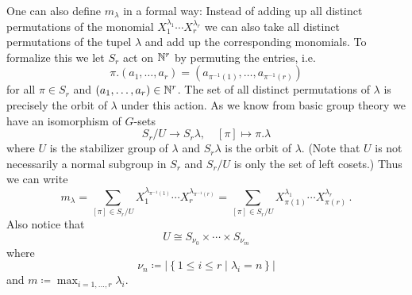 One can also define $m_\lambda$ in a formal way:
Instead of adding up all distinct permutations of the monomial $X_1^{\lambda_1} \dotsm X_r^{\lambda_r}$ we can also take all distinct permutations of the tupel $\lambda$ and add up the corresponding monomials.
To formalize this we let $S_r$ act on $\mathbb{N}^r$ by permuting the entries, i.e.\
\[
    \pi.(a_1, \dotsc, a_r)
  = \left( a_{\pi^{-1}(1)}, \dotsc, a_{\pi^{-1}(r)} \right)
\]
for all $\pi \in S_r$ and $(a_1, \dotsc, a_r) \in \mathbb{N}^r$.
The set of all distinct permutations of $\lambda$ is precisely the orbit of $\lambda$ under this action.
As we know from basic group theory we have an isomorphism of $G$-sets
\[
          S_r / U
  \to     S_r \lambda,
  \quad   [\pi]
  \mapsto \pi.\lambda
\]
where $U$ is the stabilizer group of $\lambda$ and $S_r \lambda$ is the orbit of $\lambda$.
(Note that $U$ is not necessarily a normal subgroup in $S_r$ and $S_r/U$ is only the set of left cosets.)
Thus we can write
\[
    m_\lambda
  = \sum_{[\pi] \in S_r/U} X_1^{\lambda_{\pi^{-1}(1)}} \dotsm X_r^{\lambda_{\pi^{-1}(r)}}
  = \sum_{[\pi] \in S_r/U} X_{\pi(1)}^{\lambda_1} \dotsm X_{\pi(r)}^{\lambda_r} \,.
\]
Also notice that
\[
        U
  \cong S_{\nu_0} \times \dotsb \times S_{\nu_m}
\]
where
\[
            \nu_n
  \coloneqq \left|
              \left\{
                1 \leq i \leq r
              \mid
                  \lambda_i
                = n
              \right\}
            \right|
\]
and $m \coloneqq \max_{i=1,\dotsc,r} \lambda_i$.


